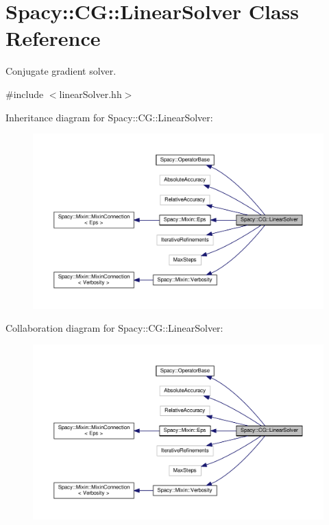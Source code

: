\hypertarget{classSpacy_1_1CG_1_1LinearSolver}{\section{Spacy\-:\-:C\-G\-:\-:Linear\-Solver Class Reference}
\label{classSpacy_1_1CG_1_1LinearSolver}
}


Conjugate gradient solver.  




{\ttfamily \#include $<$linear\-Solver.\-hh$>$}



Inheritance diagram for Spacy\-:\-:C\-G\-:\-:Linear\-Solver\-:
\nopagebreak
\begin{figure}[H]
\begin{center}
\leavevmode
\includegraphics[width=350pt]{classSpacy_1_1CG_1_1LinearSolver__inherit__graph}
\end{center}
\end{figure}


Collaboration diagram for Spacy\-:\-:C\-G\-:\-:Linear\-Solver\-:
\nopagebreak
\begin{figure}[H]
\begin{center}
\leavevmode
\includegraphics[width=350pt]{classSpacy_1_1CG_1_1LinearSolver__coll__graph}
\end{center}
\end{figure}
